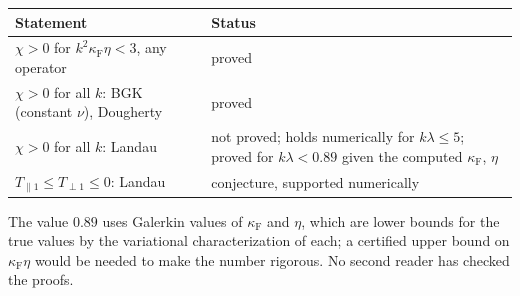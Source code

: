 \documentclass[11pt]{article}
\newcommand{\Tpar}{T_{\parallel1}}
\newcommand{\Tperp}{T_{\perp1}}
\theoremstyle{remark}
\begin{document}
\begin{center}
\renewcommand{\arraystretch}{1.3}
\begin{tabular}{p{6.4cm}p{8.2cm}}
  Statement & Status \\ \hline
  $\chi>0$ for $k^2\kappa_{\mathrm F}\eta<3$, any operator & proved \\
  $\chi>0$ for all $k$: BGK (constant $\nu$), Dougherty & proved \\
  $\chi>0$ for all $k$: Landau & not proved; holds numerically for
     $k\lambda\le5$; proved for $k\lambda<0.89$ given the computed
     $\kappa_{\mathrm F}$, $\eta$ \\
  $\Tpar\le\Tperp\le0$: Landau & conjecture, supported numerically \\
\end{tabular}
\end{center}
The value $0.89$ uses Galerkin values of $\kappa_{\mathrm F}$ and $\eta$,
which are lower bounds for the true values by the variational
characterization of each; a certified upper bound on
$\kappa_{\mathrm F}\eta$ would be needed to make the number rigorous. No
second reader has checked the proofs.
\end{document}
